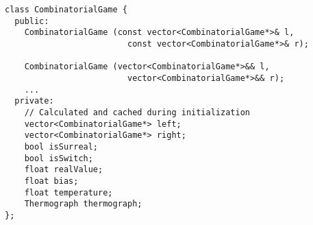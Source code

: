 \begin{lstlisting}
class CombinatorialGame {
  public:
	CombinatorialGame (const vector<CombinatorialGame*>& l,
					     const vector<CombinatorialGame*>& r);			   
					   
	CombinatorialGame (vector<CombinatorialGame*>&& l,
					     vector<CombinatorialGame*>&& r);
	...
  private:
  	// Calculated and cached during initialization
  	vector<CombinatorialGame*> left;
  	vector<CombinatorialGame*> right;
  	bool isSurreal;
  	bool isSwitch;
  	float realValue;
  	float bias;
  	float temperature;
  	Thermograph thermograph;
};

\end{lstlisting}
